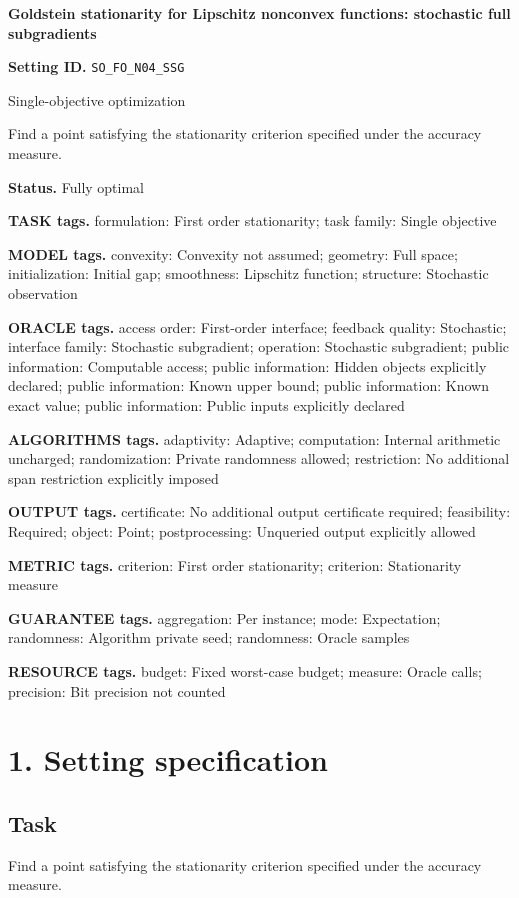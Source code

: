 \documentclass[10pt,a4paper]{article}
\begin{document}
\raggedright

{\LARGE\bfseries\sffamily\color{AtlasNavy} Goldstein stationarity for Lipschitz nonconvex functions: stochastic full subgradients\par}\vspace{5pt}
\textbf{Setting ID.} \texttt{SO\_\allowbreak{}FO\_\allowbreak{}N04\_\allowbreak{}SSG}

Single-objective optimization

Find a point satisfying the stationarity criterion specified under the accuracy measure.

\textbf{Status.} Fully optimal

\textbf{TASK tags.} formulation: First order stationarity; task family: Single objective

\textbf{MODEL tags.} convexity: Convexity not assumed; geometry: Full space; initialization: Initial gap; smoothness: Lipschitz function; structure: Stochastic observation

\textbf{ORACLE tags.} access order: First-order interface; feedback quality: Stochastic; interface family: Stochastic subgradient; operation: Stochastic subgradient; public information: Computable access; public information: Hidden objects explicitly declared; public information: Known upper bound; public information: Known exact value; public information: Public inputs explicitly declared

\textbf{ALGORITHMS tags.} adaptivity: Adaptive; computation: Internal arithmetic uncharged; randomization: Private randomness allowed; restriction: No additional span restriction explicitly imposed

\textbf{OUTPUT tags.} certificate: No additional output certificate required; feasibility: Required; object: Point; postprocessing: Unqueried output explicitly allowed

\textbf{METRIC tags.} criterion: First order stationarity; criterion: Stationarity measure

\textbf{GUARANTEE tags.} aggregation: Per instance; mode: Expectation; randomness: Algorithm private seed; randomness: Oracle samples

\textbf{RESOURCE tags.} budget: Fixed worst-case budget; measure: Oracle calls; precision: Bit precision not counted

\section{1. Setting specification}
\subsection{Task}
Find a point satisfying the stationarity criterion specified under the accuracy measure.
\end{document}
